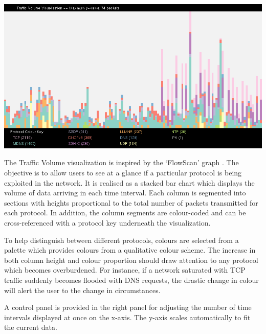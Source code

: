 \includegraphics[width=\linewidth]{materials/traffic-volume.png}

The Traffic Volume visualization is inspired by the `FlowScan' graph
\cite{plonka2000flowscan}. The objective is to allow users to see at a glance
if a particular protocol is being exploited in the network. It is realised as a
stacked bar chart which displays the volume of data arriving in each time
interval. Each column is segmented into sections with heights proportional to
the total number of packets transmitted for each protocol.
In addition, the column segments are colour-coded and can be cross-referenced
with a protocol key underneath the visualization.

To help distinguish between different protocols, colours are selected from a
palette which provides colours from a qualitative colour scheme.
The increase in both column height and colour proportion should draw attention
to any protocol which becomes overburdened. For instance, if a network
saturated with TCP traffic suddenly becomes flooded with DNS requests, the
drastic change in colour will alert the user to the change in circumstances.

A control panel is provided in the right panel for adjusting the
number of time intervals displayed at once on the x-axis. The y-axis scales
automatically to fit the current data.
